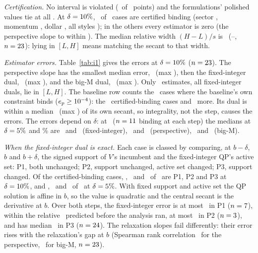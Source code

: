 \documentclass[conference]{IEEEtran}
\begin{document}
\emph{Certification.} No interval is violated (\KTwentyThreeViol\ of \KTwentyThreePoints\ points) and the formulations' polished values tie at all \VTieIOne. At $\delta=\IOneDeltaPct\%$, \IOneBindTen\ of \IOneCasesTen\ cases are certified binding (sector \IOneBindSector, momentum \IOneBindMom, dollar \IOneBindDollar, all styles \IOneBindStyle); in the others every estimator is zero (the perspective slope to within \NonBindPerspMax). The median relative width $(H-L)/s$ is \WidthMed\ (\WidthMin--\WidthMax, $n=23$): lying in $[L,H]$ means matching the secant to that width.

\emph{Estimator errors.} Table~\ref{tab:i1} gives the errors at $\delta=\IOneDeltaPct\%$ ($n=23$). The perspective slope has the smallest median error, \ErrPerspMed\ (max \ErrPerspMax), then the fixed-integer dual, \ErrFixedMed\ (max \ErrFixedMax), and the big-M dual, \ErrBigMMed\ (max \ErrBigMMax). Only \ErrFixedInLH\ estimates, all fixed-integer duals, lie in $[L,H]$. The baseline row counts the \BaseSecN\ cases where the baseline's own constraint binds ($e_p\ge10^{-4}$): the \IOneBindTen\ certified-binding cases and \BaseOnlyBind\ more. Its dual is within a median \BaseSecMed\ (max \BaseSecMax) of its own secant, so integrality, not the step, causes the errors. The errors depend on $\delta$: at \IOneRobustDate\ ($n=11$ binding at each step) the medians at $\delta=5\%$ and \IOneDeltaPct\% are \RobustFixedFive\ and \RobustFixedTen\ (fixed-integer), \RobustPerspFive\ and \RobustPerspTen\ (perspective), \RobustBigMFive\ and \RobustBigMTen\ (big-M).

\begin{table}[!t]
\caption{I1 errors $|\hat\mu-s|/|s|$ at $\delta=\IOneDeltaPct\%$, certified-binding cases, by $f$.}
\label{tab:i1}
\centering

\end{table}

\emph{When the fixed-integer dual is exact.} Each case is classed by comparing, at $b-\delta$, $b$ and $b+\delta$, the signed support of $V$'s incumbent and the fixed-integer QP's active set: P1, both unchanged; P2, support unchanged, active set changed; P3, support changed. Of the certified-binding cases, \SupPOneTen, \SupPTwoTen\ and \SupPThreeTen\ of \IOneBindTen\ are P1, P2 and P3 at $\delta=\IOneDeltaPct\%$, and \SupPOneFive, \SupPTwoFive\ and \SupPThreeFive\ of \SupBindFive\ at $\delta=5\%$. With fixed support and active set the QP solution is affine in $b$, so the value is quadratic and the central secant is the derivative at $b$. Over both steps, the fixed-integer error is at most \PredOneMax\ in P1 ($n=7$), within the relative \PredOneTol\ predicted before the analysis ran, at most \PredTwoMax\ in P2 ($n=3$), and has median \PredThreeMed\ in P3 ($n=24$). The relaxation slopes fail differently: their error rises with the relaxation's gap at $b$ (Spearman rank correlation \SpearmanPersp\ for the perspective, \SpearmanBigM\ for big-M, $n=23$).
\end{document}
